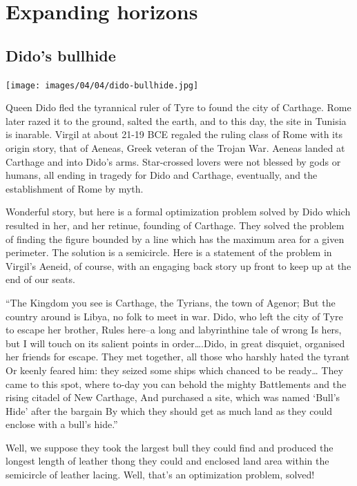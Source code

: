 \documentclass[
]{book}
\begin{document}
\hypertarget{expanding-horizons}{%
\chapter{Expanding horizons}\label{expanding-horizons}}

\hypertarget{didos-bullhide}{%
\section{Dido's bullhide}\label{didos-bullhide}}

\texttt{[image: images/04/04/dido-bullhide.jpg]}

Queen Dido fled the tyrannical ruler of Tyre to found the city of Carthage. Rome later razed it to the ground, salted the earth, and to this day, the site in Tunisia is inarable. Virgil at about 21-19 BCE regaled the ruling class of Rome with its origin story, that of Aeneas, Greek veteran of the Trojan War. Aeneas landed at Carthage and into Dido's arms. Star-crossed lovers were not blessed by gods or humans, all ending in tragedy for Dido and Carthage, eventually, and the establishment of Rome by myth.

Wonderful story, but here is a formal optimization problem solved by Dido which resulted in her, and her retinue, founding of Carthage. They solved the problem of finding the figure bounded by a line which has the maximum area for a given perimeter. The solution is a semicircle. Here is a statement of the problem in Virgil's Aeneid, of course, with an engaging back story up front to keep up at the end of our seats.

``The Kingdom you see is Carthage, the Tyrians, the town of Agenor;
But the country around is Libya, no folk to meet in war.
Dido, who left the city of Tyre to escape her brother,
Rules here--a long and labyrinthine tale of wrong
Is hers, but I will touch on its salient points in order\ldots.Dido, in great disquiet, organised her friends for escape.
They met together, all those who harshly hated the tyrant
Or keenly feared him: they seized some ships which chanced to be ready\ldots{}
They came to this spot, where to-day you can behold the mighty
Battlements and the rising citadel of New Carthage,
And purchased a site, which was named `Bull's Hide' after the bargain
By which they should get as much land as they could enclose with a bull's hide.''

Well, we suppose they took the largest bull they could find and produced the longest length of leather thong they could and enclosed land area within the semicircle of leather lacing. Well, that's an optimization problem, solved!
\end{document}
